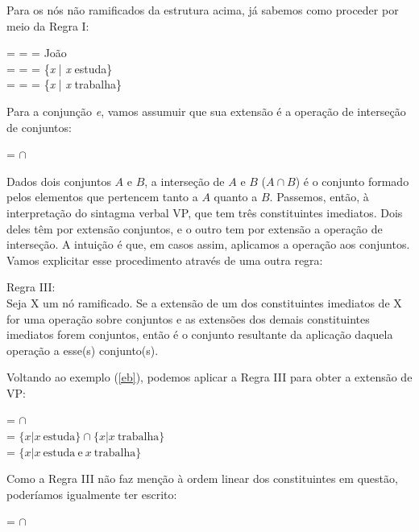 Para os nós não ramificados da estrutura acima, já sabemos como
proceder por meio da Regra I:

\begin{exe}
	\ex {} =  =  = João\\
	 =  =  = \{\textit{x} | \textit{x} estuda\} \\
	 =  =  = \{\textit{x} | \textit{x} trabalha\}
\end{exe}

\n Para a conjun\-ção \textit{e}, vamos assumuir que sua extensão é a operação de interseção de conjuntos:

\begin{exe}
	\ex {} = $\cap$
\end{exe}

\n Dados dois conjuntos $A$ e $B$, a interse\-ção de $A$ e
$B$ ($A \cap B$) é o conjunto formado pelos elementos que
pertencem tanto a $A$ quanto a $B$. Passemos, então, à interpreta\-ção do sintagma verbal VP, que tem
três constituintes imediatos. Dois deles têm por extensão
conjuntos, e o outro tem por extensão a opera\-ção de
interse\-ção. A intuição é que, em casos assim, aplicamos a operação aos conjuntos. Vamos explicitar esse procedimento através de uma outra regra:

\begin{exe}
	\ex Regra III: \\
	Seja X um nó ramificado. Se a extensão de um dos constituintes imediatos de X for uma opera\-ção sobre conjuntos e as extensões dos demais constituintes imediatos forem conjuntos, então  é o conjunto resultante da aplica\-ção daquela opera\-ção a esse(s) conjunto(s).
\end{exe}


Voltando ao exemplo (\ref{eb}), podemos aplicar a Regra III
para obter a extensão de VP:

\begin{exe}
	\ex {} =  $\cap$ \\
	 = $\{x | x\ \text{estuda}\} \cap \{x | x\ \text{trabalha}\}$\\
	 = $\{x | x\ \text{estuda}\ \text{e}\ x\ \text{trabalha}\}$
\end{exe}

\n Como a Regra III não faz menção à ordem linear dos
constituintes em questão, poderíamos igualmente ter escrito:

\begin{exe}
	\ex {} =  $\cap$ 
\end{exe}

